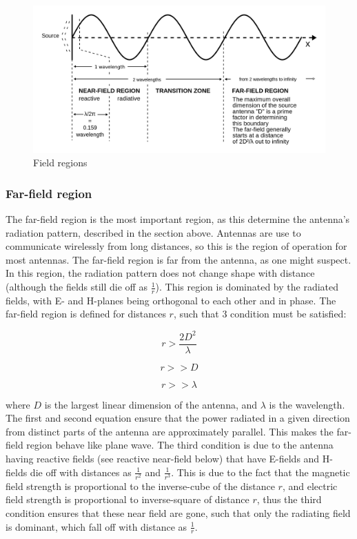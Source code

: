 \begin{figure}[h]
\hspace{-1.5cm}
\includegraphics[scale=0.25]{figures/FieldRegions.png}
\caption{Field regions}
\end{figure}

\subsubsection{Far-field region}
The far-field region is the most important region, as this determine the antenna's radiation pattern, described in the section above. Antennas are use to communicate wirelessly from long distances, so this is the region of operation for most antennas. The far-field region is far from the antenna, as one might suspect. In this region, the radiation pattern does not change shape with distance (although the fields still die off as $\frac{1}{r}$). This region is dominated by the radiated fields, with E- and H-planes being orthogonal to each other and in phase. The far-field region is defined for distances $r$, such that 3 condition must be satisfied:

\begin{equation}
    r > \frac{2D^2}{\lambda}
\end{equation}

\begin{equation}
    r >> D
\end{equation}

\begin{equation}
   r >> \lambda
\end{equation}

where $D$ is the largest linear dimension of the antenna, and $\lambda$ is the wavelength. The first and second equation ensure that the power radiated in a given direction from distinct parts of the antenna are approximately parallel. This makes the far-field region behave like plane wave. The third condition is due to the antenna having reactive fields (see reactive near-field below) that have E-fields and H-fields die off with distances as $\frac{1}{r^2}$ and $\frac{1}{r^3}$. This is due to the fact that the magnetic field strength is proportional to the inverse-cube of the distance $r$, and electric field strength is proportional to inverse-square of distance $r$, thus the third condition ensures that these near field are gone, such that only the radiating field is dominant, which fall off with distance as $\frac{1}{r}$\cite{AntennaThoryFieldRegion}. 

